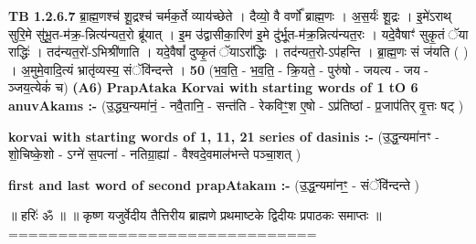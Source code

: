 \documentclass[17pt]{extarticle}
\begin{document}
                  \newline
                                \textbf{ TB 1.2.6.7} \newline
                  ब्रा॒ह्म॒णश्च॑ शू॒द्रश्च॑ चर्मक॒र्ते व्याय॑च्छेते । दैव्यो॒ वै वर्णो᳚ ब्राह्म॒णः । अ॒स॒र्यः॑ शू॒द्रः । इ॒मे॑ऽराथ् सुरि॒मे सु॑भू॒त-म॑क्र॒-न्नित्य॑न्यत॒रो ब्रू॑यात् । इ॒म उ॑द्वासीका॒रिण॑ इ॒मे दु॑र्भू॒त-म॑क्र॒न्नित्य॑न्यत॒रः । यदे॒वैषाꣳ॑ सुकृ॒तं ॅया राद्धिः॑ । तद॑न्यत॒रो॑-ऽभिश्री॑णाति । यदे॒वैषां᳚ दुष्कृ॒तं ॅयाऽरा᳚द्धिः । तद॑न्यत॒रो-ऽप॑हन्ति । ब्रा॒ह्म॒णः सं ज॑यति ( ) । अ॒मुमे॒वादि॒त्यं भ्रातृ॑व्यस्य॒ संॅवि॑न्दन्ते । \textbf{ 50} \newline
                  \newline
                                    (भ॒व॒ति॒ - भ॒व॒ति॒ - क्रि॒यते॒ - पुरु॑षो - जयत्य - जय - ञ्जय॒त्येकं॑ च) \textbf{(A6)} \newline \newline
                \textbf{PrapAtaka Korvai with starting  words of 1 tO 6 anuvAkams :-} \newline
        (उ॒द्ध्य॒न्यमा॑नं॒ - नवै॒तानि॒ - सन्त॑ति - रेकविꣳ॒॒श ए॒षो - ऽप्र॑तिष्ठां - प्र॒जाप॑तिर् वृ॒त्तः षट् ) \newline

        \textbf{korvai with starting words of 1, 11, 21 series of dasinis :-} \newline
        (उ॒द्ध॒न्यमा॑नꣳ - शो॒चिष्के॒शो - ऽग्ने॑ स॒पत्ना॑ - नतिग्रा॒ह्या॑ - वैश्वदे॒वमाल॑भन्ते पञ्चा॒शत् ) \newline

        \textbf{first and last  word of second prapAtakam :-} \newline
        (उ॒द्ध॒न्यमा॑नꣳ॒॒ - संॅवि॑न्दन्ते ) \newline 

       

        ॥ हरिः॑ ॐ ॥
॥ कृष्ण यजुर्वेदीय तैत्तिरीय ब्राह्मणे प्रथमाष्टके द्विदीयः प्रपाठकः समाप्तः ॥
=============================== \newline
        \pagebreak
        
        
        
\end{document}

